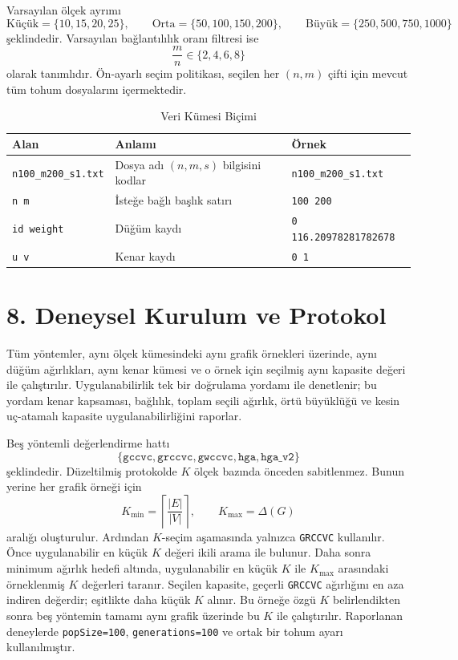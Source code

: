 \documentclass[11pt]{article}
\begin{document}
Varsayılan ölçek ayrımı
\[
\text{Küçük}=\{10,15,20,25\},\qquad
\text{Orta}=\{50,100,150,200\},\qquad
\text{Büyük}=\{250,500,750,1000\}
\]
şeklindedir. Varsayılan bağlantılılık oranı filtresi ise
\[
\frac{m}{n}\in\{2,4,6,8\}
\]
olarak tanımlıdır. Ön-ayarlı seçim politikası, seçilen her \((n,m)\) çifti için mevcut tüm tohum dosyalarını içermektedir.

\begin{table}[h]
\centering
\caption{Veri Kümesi Biçimi}
\label{tab:dataset-format-tr}
\begin{tabular}{lll}
\toprule
Alan & Anlamı & Örnek \\
\midrule
\texttt{n100\_m200\_s1.txt} & Dosya adı \((n,m,s)\) bilgisini kodlar & \texttt{n100\_m200\_s1.txt} \\
\texttt{n m} & İsteğe bağlı başlık satırı & \texttt{100 200} \\
\texttt{id weight} & Düğüm kaydı & \texttt{0 116.20978281782678} \\
\texttt{u v} & Kenar kaydı & \texttt{0 1} \\
\bottomrule
\end{tabular}
\end{table}

\section*{8. Deneysel Kurulum ve Protokol}

Tüm yöntemler, aynı ölçek kümesindeki aynı grafik örnekleri üzerinde, aynı düğüm ağırlıkları, aynı kenar kümesi ve o örnek için seçilmiş aynı kapasite değeri ile çalıştırılır. Uygulanabilirlik tek bir doğrulama yordamı ile denetlenir; bu yordam kenar kapsaması, bağlılık, toplam seçili ağırlık, örtü büyüklüğü ve kesin uç-atamalı kapasite uygulanabilirliğini raporlar.

Beş yöntemli değerlendirme hattı
\[
\{\texttt{gccvc},\texttt{grccvc},\texttt{gwccvc},\texttt{hga},\texttt{hga\_v2}\}
\]
şeklindedir. Düzeltilmiş protokolde \(K\) ölçek bazında önceden sabitlenmez. Bunun yerine her grafik örneği için
\[
K_{\min}=\left\lceil \frac{|E|}{|V|}\right\rceil,\qquad K_{\max}=\Delta(G)
\]
aralığı oluşturulur. Ardından \(K\)-seçim aşamasında yalnızca \texttt{GRCCVC} kullanılır. Önce uygulanabilir en küçük \(K\) değeri ikili arama ile bulunur. Daha sonra minimum ağırlık hedefi altında, uygulanabilir en küçük \(K\) ile \(K_{\max}\) arasındaki örneklenmiş \(K\) değerleri taranır. Seçilen kapasite, geçerli \texttt{GRCCVC} ağırlığını en aza indiren değerdir; eşitlikte daha küçük \(K\) alınır. Bu örneğe özgü \(K\) belirlendikten sonra beş yöntemin tamamı aynı grafik üzerinde bu \(K\) ile çalıştırılır. Raporlanan deneylerde \texttt{popSize=100}, \texttt{generations=100} ve ortak bir tohum ayarı kullanılmıştır.
\end{document}

